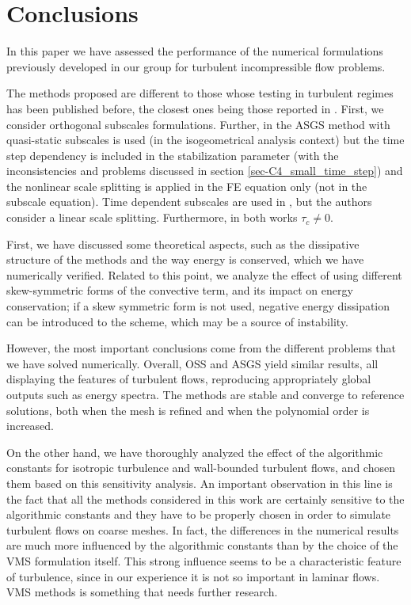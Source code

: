 \section{Conclusions}
\label{sec-C4_conclusions}

In this paper we have assessed the performance of the numerical formulations previously developed in our group \cite{codina_stabilized_2002,codina_time_2007,Codina-chap-2011,Principe2009} for turbulent incompressible flow problems. 

The methods proposed are different to those whose testing in turbulent regimes has been published before, the closest ones being those reported in \cite{bazilevs_variational_2007,gamnitzer_time-dependent_2010}. First, we consider orthogonal subscales formulations. Further, in \cite{bazilevs_variational_2007} the ASGS method with quasi-static subscales is used (in the isogeometrical analysis context) but the time step dependency is included in the stabilization parameter (with the inconsistencies and problems discussed in section \ref{sec-C4_small_time_step}) and the nonlinear scale splitting is applied in the FE equation only (not in the subscale equation). Time dependent subscales are used in \cite{gamnitzer_time-dependent_2010}, but the authors consider a linear scale splitting. Furthermore, in both works $\tau_c \neq 0$. 

First, we have discussed some theoretical aspects, such as the dissipative structure of the methods and the way energy is conserved, which we have numerically verified. Related to this point, we analyze the effect of using different skew-symmetric forms of the convective term, and its impact on energy conservation; if a skew symmetric form is not used, negative energy dissipation can be introduced to the scheme, which may be a source of instability. 

However, the most important conclusions come from the different problems that we have solved numerically. Overall, OSS and ASGS yield similar results, all displaying the features of turbulent flows, reproducing appropriately global outputs such as energy spectra. The methods are stable and converge to reference solutions, both when the mesh is refined and when the polynomial order is increased. 

On the other hand, we have thoroughly analyzed the effect of the algorithmic constants for isotropic turbulence and wall-bounded turbulent flows, and chosen them based on this sensitivity analysis. An important observation in this line is the fact that all the methods considered in this work are certainly sensitive to the algorithmic constants and they have to be properly chosen in order to simulate turbulent flows on coarse meshes. In fact, the differences in the numerical results are much more influenced by the algorithmic constants than by the choice of the VMS formulation itself.  This strong influence seems to be a characteristic feature of turbulence, since in our experience it is not so important in laminar flows. VMS methods is something that needs further research.

